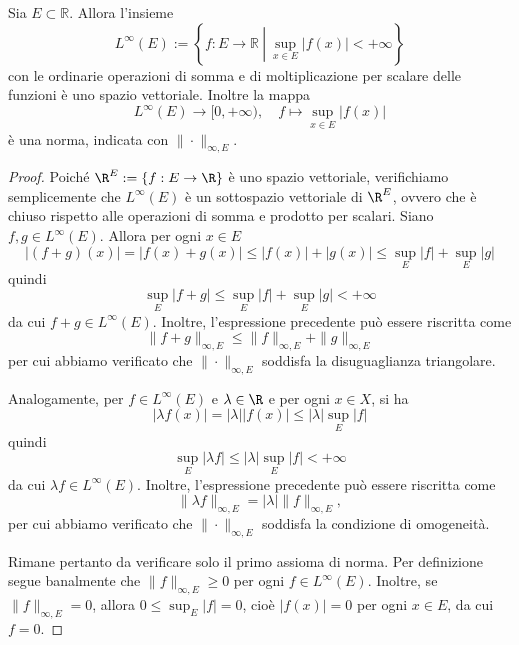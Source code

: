 \begin{proposition}[$*$]\label{prop: 4.1}
    Sia $E \subset \mathbb{R}$. Allora l'insieme
    \[L^{\infty}(E):=\left\{f: E \rightarrow \mathbb{R}\ \left|\ \sup _{x \in E}| f(x) \mid<+\infty\right.\right\}\]
    con le ordinarie operazioni di somma e di moltiplicazione per scalare delle funzioni è uno spazio vettoriale. Inoltre la mappa
    \[L^{\infty}(E) \rightarrow[0,+\infty), \quad f \mapsto \sup _{x \in E}|f(x)|\]
    è una norma, indicata con $\|\cdot\|_{\infty, E}$.    
\end{proposition}
\begin{proof}
    Poiché $\R^E:=\{f: E\to \R\}$ è uno spazio vettoriale, verifichiamo semplicemente che $L^{\infty}(E)$ è un sottospazio vettoriale di $\R^E$, ovvero che è chiuso rispetto alle operazioni di somma e prodotto per scalari. Siano $f,g\in L^{\infty}(E)$. Allora per ogni $x\in E$
    \[|(f+g)(x)| = |f(x)+g(x)|\leq |f(x)|+|g(x)|\leq \sup_E|f|+\sup_E|g|\]
    quindi 
    \[\sup_E|f+g|\leq \sup_E|f| + \sup_E|g|<+\infty\]
    da cui $f+g\in L^{\infty}(E)$. Inoltre, l'espressione precedente può essere riscritta come
    \[\|f+g\|_{\infty, E}\leq \|f\|_{\infty, E} + \|g\|_{\infty, E}\]
    per cui abbiamo verificato che $\|\cdot\|_{\infty, E}$ soddisfa la disuguaglianza triangolare.

    Analogamente, per $f\in L^{\infty}(E)$ e $\lambda\in \R$ e per ogni $x \in X$, si ha
    \[|\lambda f(x)| = |\lambda||f(x)|\leq |\lambda|\sup_E|f|\]
    quindi
    \[\sup_E|\lambda f|\leq |\lambda|\sup_E|f|<+\infty\]
    da cui $\lambda f\in L^{\infty}(E)$. Inoltre, l'espressione precedente può essere riscritta come \[\|\lambda f\|_{\infty, E}=|\lambda|\|f\|_{\infty, E},\] per cui abbiamo verificato che $\|\cdot\|_{\infty, E}$ soddisfa la condizione di omogeneità.

    Rimane pertanto da verificare solo il primo assioma di norma. Per definizione segue banalmente che $\|f\|_{\infty,E}\geq 0$ per ogni $f\in L^{\infty}(E)$. Inoltre, se $\|f\|_{\infty,E}=0$, allora $0\leq \sup_E|f|=0$, cioè $|f(x)|=0$ per ogni $x\in E$, da cui $f=0$.
\end{proof}

